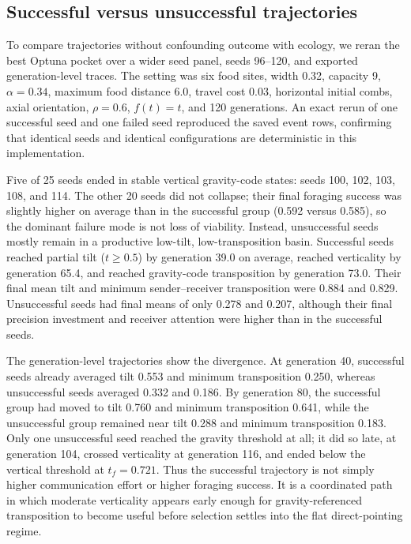 \documentclass[11pt]{article}
\begin{document}
\subsection{Successful versus unsuccessful trajectories}

To compare trajectories without confounding outcome with ecology, we reran the
best Optuna pocket over a wider seed panel, seeds 96--120, and exported
generation-level traces. The setting was six food sites, width 0.32, capacity
9, $\alpha=0.34$, maximum food distance 6.0, travel cost 0.03, horizontal
initial combs, axial orientation, $\rho=0.6$, $f(t)=t$, and 120 generations.
An exact rerun of one successful seed and one failed seed reproduced the saved
event rows, confirming that identical seeds and identical configurations are
deterministic in this implementation.

Five of 25 seeds ended in stable vertical gravity-code states: seeds 100, 102,
103, 108, and 114. The other 20 seeds did not collapse; their final foraging
success was slightly higher on average than in the successful group
(0.592 versus 0.585), so the dominant failure mode is not loss of viability.
Instead, unsuccessful seeds mostly remain in a productive low-tilt,
low-transposition basin. Successful seeds reached partial tilt ($t \geq 0.5$)
by generation 39.0 on average, reached verticality by generation 65.4, and
reached gravity-code transposition by generation 73.0. Their final mean tilt
and minimum sender--receiver transposition were 0.884 and 0.829. Unsuccessful
seeds had final means of only 0.278 and 0.207, although their final precision
investment and receiver attention were higher than in the successful seeds.

The generation-level trajectories show the divergence. At generation 40,
successful seeds already averaged tilt 0.553 and minimum transposition 0.250,
whereas unsuccessful seeds averaged 0.332 and 0.186. By generation 80, the
successful group had moved to tilt 0.760 and minimum transposition 0.641, while
the unsuccessful group remained near tilt 0.288 and minimum transposition
0.183. Only one unsuccessful seed reached the gravity threshold at all; it did
so late, at generation 104, crossed verticality at generation 116, and ended
below the vertical threshold at $t_f=0.721$. Thus the successful trajectory is
not simply higher communication effort or higher foraging success. It is a
coordinated path in which moderate verticality appears early enough for
gravity-referenced transposition to become useful before selection settles into
the flat direct-pointing regime.
\end{document}
